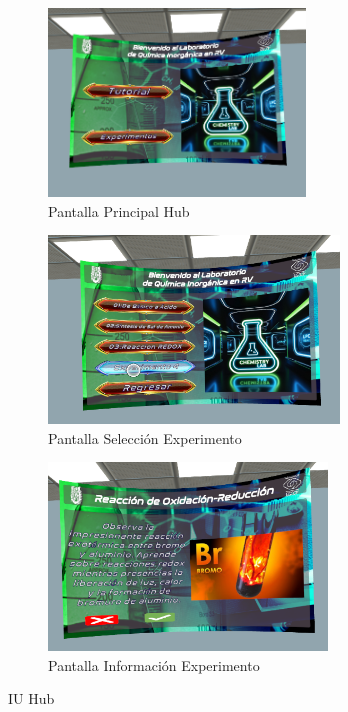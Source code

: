 \begin{figure}[thbp]
    \centering
    \begin{subfigure}[b]{0.4\linewidth}
        \includegraphics[width=\linewidth, height = 5cm]{img/chapter04/UI_Hub.png}
        \caption{Pantalla Principal Hub}
        \label{fig:Hub_Principal}
    \end{subfigure}
    \begin{subfigure}[b]{0.4\linewidth}
        \includegraphics[width=\linewidth, height = 5cm]{img/chapter04/UI_Hub_Experiments.png}
        \caption{Pantalla Selección Experimento}
        \label{fig:Hub_Experimentos}
    \end{subfigure}
    \begin{subfigure}[b]{0.4\linewidth}
        \includegraphics[width=\linewidth, height = 5cm]{img/chapter04/UI_Hub_Experiment.png}
        \caption{Pantalla Información Experimento}
        \label{fig:Hub_Experimento}
    \end{subfigure}
    \caption{IU Hub}
\end{figure}
\newpage
